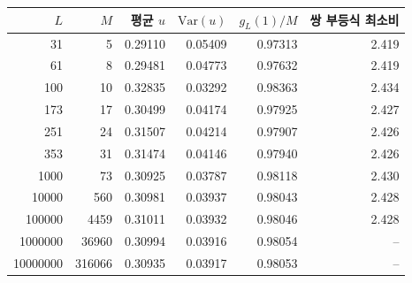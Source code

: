 \begin{tabular}{rrrrrr}
\toprule
$L$ & $M$ & 평균 $u$ & $\mathrm{Var}(u)$ & $g_L(1)/M$ & 쌍 부등식 최소비\\
\midrule
31 & 5 & 0.29110 & 0.05409 & 0.97313 & 2.419\\
61 & 8 & 0.29481 & 0.04773 & 0.97632 & 2.419\\
100 & 10 & 0.32835 & 0.03292 & 0.98363 & 2.434\\
173 & 17 & 0.30499 & 0.04174 & 0.97925 & 2.427\\
251 & 24 & 0.31507 & 0.04214 & 0.97907 & 2.426\\
353 & 31 & 0.31474 & 0.04146 & 0.97940 & 2.426\\
1000 & 73 & 0.30925 & 0.03787 & 0.98118 & 2.430\\
10000 & 560 & 0.30981 & 0.03937 & 0.98043 & 2.428\\
100000 & 4459 & 0.31011 & 0.03932 & 0.98046 & 2.428\\
1000000 & 36960 & 0.30994 & 0.03916 & 0.98054 & --\\
10000000 & 316066 & 0.30935 & 0.03917 & 0.98053 & --\\
\bottomrule
\end{tabular}